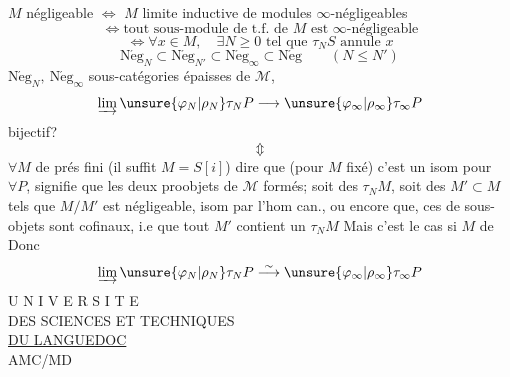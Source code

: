 \(M\) négligeable \(\Longleftrightarrow\) \(M\) limite inductive de modules
\(\infty\)-négligeables
\[
\Longleftrightarrow\text{tout sous-module de t.f. de }M\text{ est }\infty\text{-négligeable}
\]
\[
\Longleftrightarrow\forall x\in M,\quad\exists N\geq0\text{ tel que }\tau_NS\text{ annule }x
\]
\[
\mathrm{N\acute eg}_N\subset\mathrm{N\acute eg}_{N'}\subset
\mathrm{N\acute eg}_\infty\subset\mathrm{N\acute eg}
\qquad(N\leq N')
\]
\(\mathrm{N\acute eg}_N,\ \mathrm{N\acute eg}_\infty\) sous-catégories épaisses
de \(\mathcal M\),
\[
\varinjlim\unsure{\varphi_N|\rho_N}\tau_NP
 \longrightarrow\unsure{\varphi_\infty|\rho_\infty}\tau_\infty P
\]
bijectif?
\[\Updownarrow\]
\(\forall M\) de prés fini (il suffit \(M=S[i]\))
dire que (pour \(M\) fixé) c'est un isom pour \(\forall P\), signifie que les deux
proobjets de \(\mathcal M\) formés; soit des \(\tau_NM\), soit des
\(M'\subset M\) tels que \(M/M'\) est négligeable,  isom par
l'hom can., ou encore que, ces  de sous-objets sont cofinaux,
i.e que tout \(M'\) contient un \(\tau_NM\)
Mais c'est le cas si \(M\) de 
Donc
\[
\varinjlim\unsure{\varphi_N|\rho_N}\tau_NP
 \overset\sim\longrightarrow\unsure{\varphi_\infty|\rho_\infty}\tau_\infty P
\]
U N I V E R S I T E\\
DES SCIENCES ET TECHNIQUES\\
\uline{DU LANGUEDOC}\\
AMC/MD

